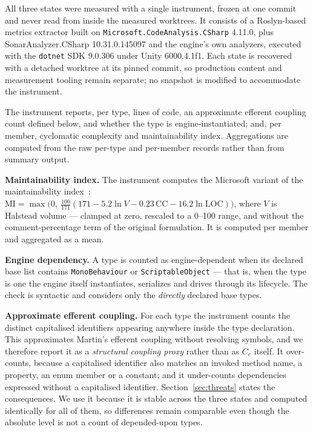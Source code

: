 \documentclass[pdflatex,sn-basic]{sn-jnl}
\begin{document}
All three states were measured with a single instrument, frozen at one commit and never read from inside the measured worktrees. It consists of a Roslyn-based metrics extractor built on \texttt{Microsoft.CodeAnalysis.CSharp} 4.11.0, plus SonarAnalyzer.CSharp 10.31.0.145097 and the engine's own analyzers, executed with the \texttt{dotnet} SDK 9.0.306 under Unity 6000.4.1f1. Each state is recovered with a detached worktree at its pinned commit, so production content and measurement tooling remain separate; no snapshot is modified to accommodate the instrument.

The instrument reports, per type, lines of code, an approximate efferent coupling count defined below, and whether the type is engine-instantiated; and, per member, cyclomatic complexity and maintainability index. Aggregations are computed from the raw per-type and per-member records rather than from summary output.

\medskip\noindent\textbf{Maintainability index.} The instrument computes the Microsoft variant of the maintainability index~\citep{coleman1994}: $\mathrm{MI} = \max\bigl(0,\ \tfrac{100}{171}(171 - 5.2\ln V - 0.23\,\mathrm{CC} - 16.2\ln \mathrm{LOC})\bigr)$, where $V$ is Halstead volume --- clamped at zero, rescaled to a 0--100 range, and without the comment-percentage term of the original formulation. It is computed per member and aggregated as a mean.

\medskip\noindent\textbf{Engine dependency.} A type is counted as engine-dependent when its declared base list contains \texttt{MonoBehaviour} or \texttt{ScriptableObject} --- that is, when the type is one the engine itself instantiates, serializes and drives through its lifecycle. The check is syntactic and considers only the \emph{directly} declared base types.

\medskip\noindent\textbf{Approximate efferent coupling.} For each type the instrument counts the distinct capitalised identifiers appearing anywhere inside the type declaration. This approximates Martin's efferent coupling \citep{martin2003} without resolving symbols, and we therefore report it as a \emph{structural coupling proxy} rather than as $C_e$ itself. It over-counts, because a capitalised identifier also matches an invoked method name, a property, an enum member or a constant; and it under-counts dependencies expressed without a capitalised identifier. Section~\ref{sec:threats} states the consequences. We use it because it is stable across the three states and computed identically for all of them, so differences remain comparable even though the absolute level is not a count of depended-upon types.
\end{document}
